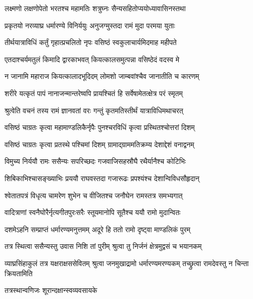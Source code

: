 \twolineshloka
{लक्ष्मणो लक्षणोपेतो भरतश्च महामतिः}
{शत्रुघ्नः सैन्यसहितोप्ययोध्यावासिनस्तथा}%

\twolineshloka
{प्रकृतयो नरव्याघ्र धर्मारण्ये विनिर्ययुः}
{अनुजग्मुस्तदा रामं मुदा परमया युताः}%

\twolineshloka
{तीर्थयात्राविधिं कर्तुं गृहात्प्रचलितो नृपः}
{वसिष्ठं स्वकुलाचार्यमिदमाह महीपते}%


\twolineshloka
{एतदाश्चर्यमतुलं किमादि द्वारकाभवत्}
{कियत्कालसमुत्पन्ना वसिष्ठेदं वदस्व मे}%


\twolineshloka
{न जानामि महाराज कियत्कालादभूदिदम्}
{लोमशो जाम्बवांश्चैव जानातीति च कारणम्}%

\twolineshloka
{शरीरे यत्कृतं पापं नानाजन्मान्तरेष्वपि}
{प्रायश्चितं हि सर्वेषामेतत्क्षेत्र परं स्मृतम्}%

\twolineshloka
{श्रुत्वेति वचनं तस्य रामं ज्ञानवतां वरः}
{गन्तुं कृतमतिस्तीर्थं यात्राविधिमथाचरत्}%

\twolineshloka
{वसिष्ठं चाग्रतः कृत्वा महामाण्डलिकैर्नृपैः}
{पुनश्चरविधिं कृत्वा प्रस्थितश्चोत्तरां दिशम्}%

\twolineshloka
{वसिष्ठं चाग्रतः कृत्वा प्रतस्थे पश्चिमां दिशम्}
{ग्रामाद्ग्राममतिक्रम्य देशाद्देशं वनाद्वनम्}%

\twolineshloka
{विमुच्य निर्ययौ रामः ससैन्यः सपरिच्छदः}
{गजवाजिसहस्रौघै रथैर्यानैश्च कोटिभिः}%

\twolineshloka
{शिबिकाभिश्चासङ्ख्याभिः प्रययौ राघवस्तदा}
{गजारूढः प्रपश्यंश्च देशान्विविधसौहृदान्}%

\twolineshloka
{श्वेतातपत्रं विधृत्य चामरेण शुभेन च}
{वीजितश्च जनौघेन रामस्तत्र समभ्यगात्}%

\twolineshloka
{वादित्राणां स्वनैघोरैर्नृत्यगीतपुरःसरैः}
{स्तूयमानोपि सूतैश्च ययौ रामो मुदान्वितः}%

\twolineshloka
{दशमेऽहनि सम्प्राप्तं धर्मारण्यमनुत्तमम्}
{अदूरे हि ततो रामो दृष्ट्वा माण्डलिकं पुरम्}%

\twolineshloka
{तत्र स्थित्वा ससैन्यस्तु उवास निशि तां पुरीम्}
{श्रुत्वा तु निर्जनं क्षेत्रमुद्वसं च भयानकम्}%

\threelineshloka
{व्याघ्रसिंहाकुलं तत्र यक्षराक्षससेवितम्}
{श्रुत्वा जनमुखाद्रामो धर्मारण्यमरण्यकम्}
{तच्छ्रुत्वा रामदेवस्तु न चिन्ता क्रियतामिति}%

\onelineshloka
{तत्रस्थान्वणिजः शूरान्दक्षान्स्वव्यवसायके}%

